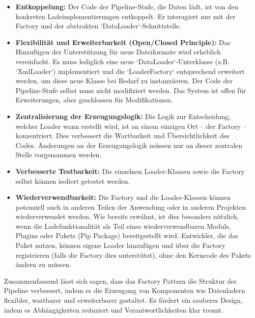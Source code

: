 \documentclass[11pt, a4paper]{article}
\begin{document}
\begin{itemize}
    \item \textbf{Entkoppelung:} Der Code der Pipeline-Stufe, die Daten lädt, ist von den konkreten Ladeimplementierungen entkoppelt. Er interagiert nur mit der Factory und der abstrakten `DataLoader`-Schnittstelle.
    \item \textbf{Flexibilität und Erweiterbarkeit (Open/Closed Principle):} Das Hinzufügen der Unterstützung für neue Dateiformate wird erheblich vereinfacht. Es muss lediglich eine neue `DataLoader`-Unterklasse (z.B. `XmlLoader`) implementiert und die `LoaderFactory` entsprechend erweitert werden, um diese neue Klasse bei Bedarf zu instanziieren. Der Code der Pipeline-Stufe selbst muss nicht modifiziert werden. Das System ist offen für Erweiterungen, aber geschlossen für Modifikationen.
    \item \textbf{Zentralisierung der Erzeugungslogik:} Die Logik zur Entscheidung, welcher Loader wann erstellt wird, ist an einem einzigen Ort – der Factory – konzentriert. Dies verbessert die Wartbarkeit und Übersichtlichkeit des Codes. Änderungen an der Erzeugungslogik müssen nur an dieser zentralen Stelle vorgenommen werden.
    \item \textbf{Verbesserte Testbarkeit:} Die einzelnen Loader-Klassen sowie die Factory selbst können isoliert getestet werden.
    \item \textbf{Wiederverwendbarkeit:} Die Factory und die Loader-Klassen können potenziell auch in anderen Teilen der Anwendung oder in anderen Projekten wiederverwendet werden. Wie bereits erwähnt, ist dies besonders nützlich, wenn die Ladefunktionalität als Teil eines wiederverwendbaren Moduls, Plugins oder Pakets (Pip Package) bereitgestellt wird. Entwickler, die das Paket nutzen, können eigene Loader hinzufügen und über die Factory registrieren (falls die Factory dies unterstützt), ohne den Kerncode des Pakets ändern zu müssen.
\end{itemize}

Zusammenfassend lässt sich sagen, dass das Factory Pattern die Struktur der Pipeline verbessert, indem es die Erzeugung von Komponenten wie Datenladern flexibler, wartbarer und erweiterbarer gestaltet. Es fördert ein sauberes Design, indem es Abhängigkeiten reduziert und Verantwortlichkeiten klar trennt.


\nocite{*}


\end{document}
